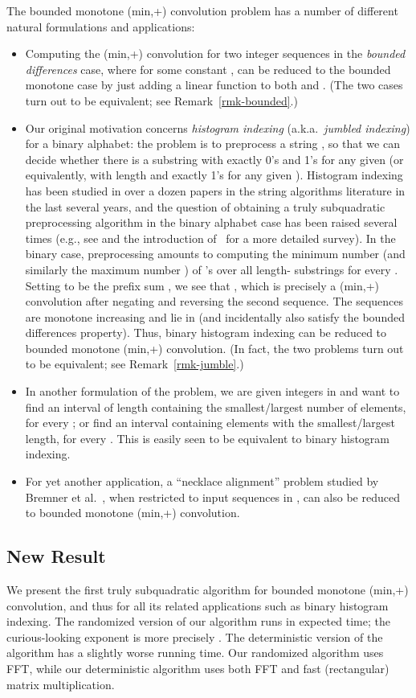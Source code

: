 \documentclass[11pt]{article}
\newcommand{\LONG}[1]{#1}\newcommand{\SHORT}[1]{}
\begin{document}
The bounded monotone (min,+) convolution problem has a number
of different natural formulations and applications:
\begin{itemize}
\item
Computing the (min,+) convolution  for two integer sequences in
the \emph{bounded differences} case, where
 for some constant ,
can be reduced to the bounded monotone case by
just adding a linear function  to both  and .
(The two cases turn out to be equivalent\LONG{; see Remark~\ref{rmk-bounded}}.)
\item
Our original motivation concerns {\em histogram indexing}
(a.k.a.\ {\em jumbled indexing}) for a binary alphabet: the problem
is to preprocess a string , so that we can decide whether there is a substring with exactly  0's and  1's for any given  (or equivalently,
with length  and exactly  1's for any given ).
Histogram indexing has been studied in over a dozen papers in the string algorithms literature in the last several years, and
the question of obtaining a truly subquadratic preprocessing
algorithm in the binary alphabet case has been raised several times
(e.g., see \cite{BCFL10,MR10,MR12} and the introduction of~\cite{ACLL14} for a more detailed survey).
In the binary case,
preprocessing amounts to computing the minimum number 
(and similarly the maximum number ) of 's
over all length- substrings for every .
Setting  to be the prefix sum , we see
that , which is precisely
a (min,+) convolution after negating and reversing the second
sequence.  The sequences are monotone increasing and lie in 
(and incidentally also satisfy the bounded differences property).
Thus, binary histogram indexing can be reduced to bounded monotone
(min,+) convolution.
(In fact, the two problems turn out to be equivalent\LONG{; see Remark~\ref{rmk-jumble}}.)
\item
In another formulation of the problem, we are
given  integers in  and want to find an interval
of length  containing the smallest/largest number of elements,
for every ; or find an interval containing
 elements with the smallest/largest length, for every .
This is easily seen to be equivalent to binary histogram indexing.
\item
For yet another application,
a ``necklace alignment'' problem
studied by Bremner et al.~\cite{BCDEHILPT14}, when restricted to input
sequences in , can also be reduced to bounded monotone (min,+) convolution.
\end{itemize}

\subsection{New Result}
We present the first truly subquadratic algorithm
for bounded monotone (min,+) convolution, and thus for
all its related applications such as binary histogram indexing.
The randomized version of our algorithm runs in
 expected time; the curious-looking exponent is
more precisely .
The deterministic version of the algorithm has a slightly worse
 running time.  Our randomized algorithm uses FFT,
while
our deterministic algorithm uses both FFT and fast (rectangular) matrix multiplication.
\end{document}
